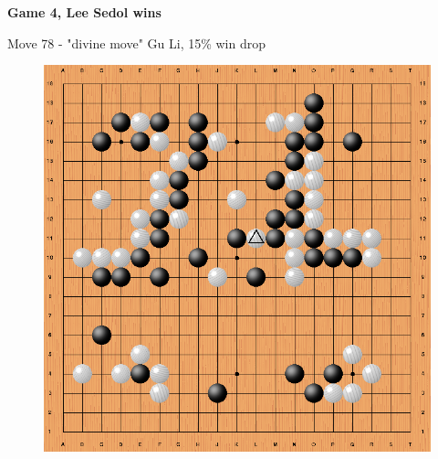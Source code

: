 \documentclass[xcolor=dvipsnames]{beamer}
\begin{document}
\begin{frame}{\bf Game 4, Lee Sedol wins}

Move 78 - "divine move" Gu Li, 15\% win drop

\begin{figure}[!htb]
  \centering
  \includegraphics[scale=0.2]{../../pictures/alpha_go_game_4.png}
\end{figure}

\end{frame}
\end{document}
